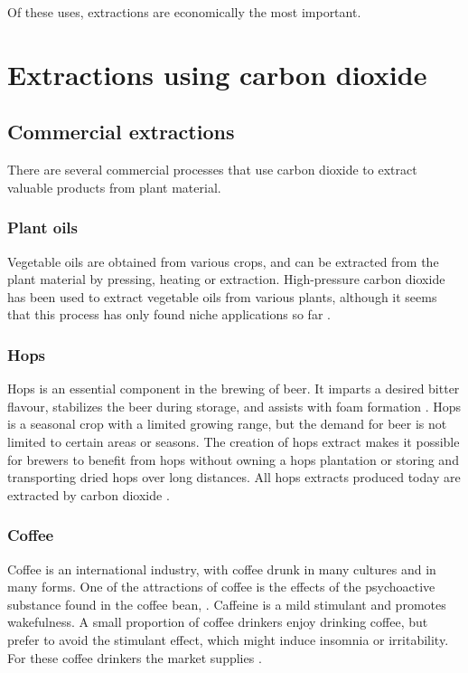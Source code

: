 Of these uses, extractions are economically the most important.

\section{Extractions using carbon dioxide}

\subsection{Commercial extractions}

There are several commercial processes that use carbon dioxide to extract
valuable products from plant material.

\subsubsection{Plant oils}

Vegetable oils are obtained from various crops, and can be extracted from the
plant material by pressing, heating or extraction. High-pressure carbon dioxide
has been used to extract vegetable oils from various plants, although it seems
that this process has only found niche applications so far
\autocite{Eisenmenger2006,Grazyna2018}.

\subsubsection{Hops}

Hops is an essential component in the brewing of beer. It imparts a desired
bitter flavour, stabilizes the beer during storage, and assists with foam
formation \autocite{Schoenberger2011}. Hops is a seasonal crop with a limited
growing range, but the demand for beer is not limited to certain areas or
seasons. The creation of hops extract makes it possible for brewers to benefit from 
hops without owning a hops plantation or storing and transporting dried hops
over long distances. All hops extracts produced today are extracted by carbon
dioxide \autocite{Hunt2010}.

\subsubsection{Coffee}

Coffee is an international industry, with coffee drunk in many cultures and in
many forms. One of the attractions of coffee is the effects of the psychoactive
substance found in the coffee bean, . Caffeine is a mild
stimulant and promotes wakefulness. A small proportion of coffee drinkers enjoy
drinking coffee, but prefer to avoid the stimulant effect, which might induce
insomnia or irritability. For these coffee drinkers the market supplies
.

